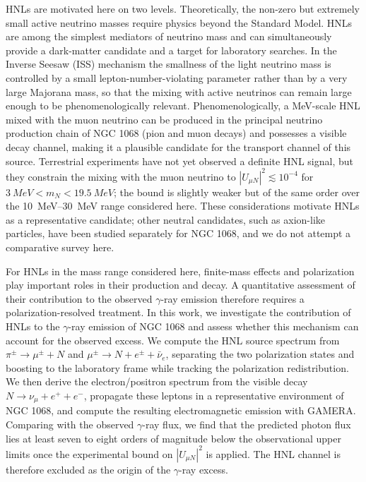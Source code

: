 \documentclass{ws-ijmpa}
\begin{document}
HNLs are motivated here on two levels. Theoretically, the non-zero but
extremely small active neutrino masses require physics beyond the Standard
Model.\cite{ASAKA200517, Boyarsky_2019} HNLs are among the simplest
mediators of neutrino mass and can simultaneously provide a dark-matter candidate and
a target for laboratory searches.\cite{PhysRevLett.103.241802} In the
Inverse Seesaw (ISS) mechanism the smallness of the light neutrino mass is
controlled by a small lepton-number-violating parameter rather than by a
very large Majorana mass, so that the mixing with active neutrinos can
remain large enough to be phenomenologically relevant. Phenomenologically,
a MeV-scale HNL mixed with the muon neutrino can be produced in the
principal neutrino production chain of NGC 1068 (pion and muon decays) and
possesses a visible decay channel, making it a plausible candidate for the
transport channel of this source. Terrestrial experiments have not yet
observed a definite HNL signal, but they constrain the mixing with the muon
neutrino to $|U_{\mu N}|^2 \lesssim 10^{-4}$ for
$\qty{3}{MeV} < m_N < \qty{19.5}{MeV}$;\cite{bryman2019constraints} the
bound is slightly weaker but of the same order over the
\qtyrange{10}{30}{MeV} range considered here. These considerations motivate
HNLs as a representative candidate; other neutral candidates, such as
axion-like particles, have been studied separately for
NGC 1068,\cite{pant2024constraining} and we do not attempt a comparative
survey here.

For HNLs in the mass range considered here, finite-mass effects and 
polarization play important roles in their production and decay. 
A quantitative assessment of their contribution to the observed 
$\gamma$-ray emission therefore requires a polarization-resolved treatment.
In this work, we investigate the contribution of HNLs to the $\gamma$-ray 
emission of NGC 1068 and assess whether this mechanism can account 
for the observed excess.
We compute the
HNL source spectrum from $\pi^\pm \to \mu^\pm + N$ and
$\mu^\pm \to N + e^\pm + \bar{\nu}_e$, separating the two polarization states
and boosting to the laboratory frame while tracking the polarization
redistribution. We then derive the electron/positron spectrum from the
visible decay $N \to \nu_\mu + e^+ + e^-$, propagate these leptons in a
representative environment of NGC 1068, and compute the resulting
electromagnetic emission with GAMERA.\cite{Hahn:2016CO} Comparing with the
observed $\gamma$-ray flux, we find that the predicted photon flux lies at
least seven to eight orders of magnitude below the observational upper
limits once the experimental bound on $|U_{\mu N}|^2$ is applied. The HNL
channel is therefore excluded as the origin of the $\gamma$-ray excess.
\end{document}
